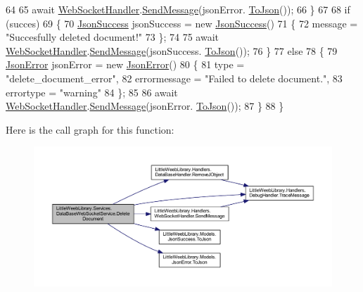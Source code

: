 \begin{DoxyCode}
64 
65                 await \mbox{\hyperlink{class_little_weeb_library_1_1_handlers_1_1_web_socket_handler}{WebSocketHandler}}.\mbox{\hyperlink{class_little_weeb_library_1_1_handlers_1_1_web_socket_handler_a1de289d54d665a32c93478c68d3e6ad0}{SendMessage}}(jsonError.
      \mbox{\hyperlink{class_little_weeb_library_1_1_models_1_1_json_error_a0e3e7dd2e2990404b7f0461742b23440}{ToJson}}());
66             \}
67 
68             \textcolor{keywordflow}{if} (succes)
69             \{
70                 \mbox{\hyperlink{class_little_weeb_library_1_1_models_1_1_json_success}{JsonSuccess}} jsonSuccess = \textcolor{keyword}{new} \mbox{\hyperlink{class_little_weeb_library_1_1_models_1_1_json_success}{JsonSuccess}}()
71                 \{
72                     message = \textcolor{stringliteral}{"Succesfully deleted document!"}
73                 \};
74 
75                 await \mbox{\hyperlink{class_little_weeb_library_1_1_handlers_1_1_web_socket_handler}{WebSocketHandler}}.\mbox{\hyperlink{class_little_weeb_library_1_1_handlers_1_1_web_socket_handler_a1de289d54d665a32c93478c68d3e6ad0}{SendMessage}}(jsonSuccess.
      \mbox{\hyperlink{class_little_weeb_library_1_1_models_1_1_json_success_a407103dc37a77aaf47a782296bab7518}{ToJson}}());
76             \}
77             \textcolor{keywordflow}{else}
78             \{
79                 \mbox{\hyperlink{class_little_weeb_library_1_1_models_1_1_json_error}{JsonError}} jsonError = \textcolor{keyword}{new} \mbox{\hyperlink{class_little_weeb_library_1_1_models_1_1_json_error}{JsonError}}()
80                 \{
81                     type = \textcolor{stringliteral}{"delete\_document\_error"},
82                     errormessage = \textcolor{stringliteral}{"Failed to delete document."},
83                     errortype = \textcolor{stringliteral}{"warning"}
84                 \};
85 
86                 await \mbox{\hyperlink{class_little_weeb_library_1_1_handlers_1_1_web_socket_handler}{WebSocketHandler}}.\mbox{\hyperlink{class_little_weeb_library_1_1_handlers_1_1_web_socket_handler_a1de289d54d665a32c93478c68d3e6ad0}{SendMessage}}(jsonError.
      \mbox{\hyperlink{class_little_weeb_library_1_1_models_1_1_json_error_a0e3e7dd2e2990404b7f0461742b23440}{ToJson}}());
87             \}
88         \}
\end{DoxyCode}
Here is the call graph for this function\+:\nopagebreak
\begin{figure}[H]
\begin{center}
\leavevmode
\includegraphics[width=350pt]{class_little_weeb_library_1_1_services_1_1_data_base_web_socket_service_a5d9baf510f46f6a3fac9fe84325bb017_cgraph}
\end{center}
\end{figure}
